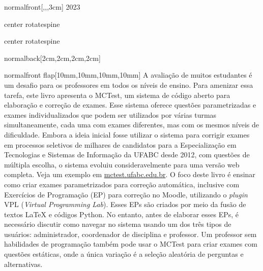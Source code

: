 \documentclass[
    coverwidth=21cm,  %
    coverheight=29.7cm, %
    spinewidth=12mm,  %
    flapwidth=8cm,    %
    wrapwidth=0mm,    %
    ]{bookcover}
\begin{document}
\begin{bookcover}
\begin{bookcoverelement}{normal}{front}[,,,3cm]
{\centering
\color{green!30!black!80}\Large 2023}

\end{bookcoverelement}


\begin{bookcoverelement}{center rotate}{spine}
    \color{yellow}\sffamily\bfseries
\end{bookcoverelement}

\begin{bookcoverelement}{center rotate}{spine}
    \color{yellow}\sffamily\bfseries
\end{bookcoverelement}

\begin{bookcoverelement}{normal}{back}[2cm,2cm,2cm,2cm]
    \color{white}%
\end{bookcoverelement}

\begin{bookcoverelement}{normal}{front flap}[10mm,10mm,10mm,10mm]
    \color{black}\large
A avaliação de muitos estudantes é um desafio para os professores em todos os níveis de ensino. Para ame\-nizar essa tarefa, este livro apresenta o MCTest, um sistema de código aberto para elaboração e correção de exa\-mes. Esse sistema oferece questões parametrizadas e exa\-mes indivi\-dualizados que podem ser utilizados por várias turmas simulta\-neamente, cada uma com exames diferentes, mas com os mesmos níveis de dificuldade.
%
Embora a ideia inicial fosse utilizar o sistema para corrigir exames em processos seletivos de mi\-lhares de candidatos para a Especia\-lização em Tecnologias e Sistemas de Informação da UFABC desde 2012, com questões de múltipla escolha, o sistema evoluiu considera\-velmente para uma versão web completa. Veja um exemplo em \url{mctest.ufabc.edu.br}.
%
O foco deste livro é ensinar como criar exames parametrizados para correção automática, inclusive com Exercícios de Programação (EP) para correção no Moodle, utilizando o \textit{plugin} VPL (\textit{Virtual Programming Lab}). Esses EPs são criados por meio da fusão de tex\-tos \LaTeX{} e códigos Python.
%
No entanto, antes de elaborar esses EPs, é necessário discutir como navegar no sistema usando um dos três tipos de usuários: administrador, coordenador de disciplina e professor. Um professor sem habilidades de programação também pode usar o MCTest para criar exames com questões estáticas, onde a única variação é a seleção aleatória de perguntas e alternativas. %
\end{bookcoverelement}


\end{bookcover}
\end{document}
